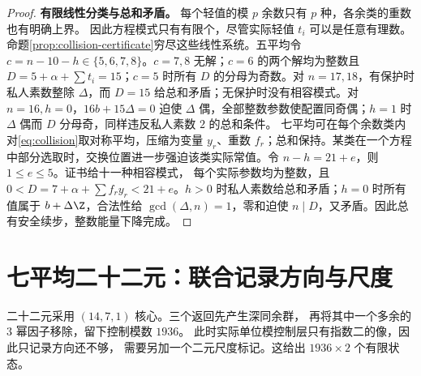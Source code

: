 \begin{proof}
\par\noindent\textbf{有限线性分类与总和矛盾。}
每个轻值的模 $p$ 余数只有 $p$ 种，各余类的重数也有明确上界。
因此方程模式只有有限个，尽管实际轻值 $t_i$ 可以是任意有理数。
命题\ref{prop:collision-certificate}穷尽这些线性系统。五平均令 $c=n-10-h\in\{5,6,7,8\}$。$c=7,8$ 无解；$c=6$ 的两个解均为整数且 $D=5+\alpha+\sum t_i=15$；$c=5$ 时所有 $D$ 的分母为奇数。对 $n=17,18$，有保护时私人素数整除 $\Delta$，而 $D=15$ 给总和矛盾；无保护时没有相容模式。对 $n=16,h=0$，$16b+15\Delta=0$ 迫使 $\Delta$ 偶，全部整数参数使配置同奇偶；$h=1$ 时 $\Delta$ 偶而 $D$ 分母奇，同样违反私人素数 $2$ 的总和条件。
七平均可在每个余数类内对\eqref{eq:collision}取对称平均，压缩为变量 $y_r$、重数 $f_r$；总和保持。某类在一个方程中部分选取时，交换位置进一步强迫该类实际常值。令 $n-h=21+e$，则 $1\le e\le5$。证书给十一种相容模式，
每个实际参数均为整数，且 $0<D=7+\alpha+\sum f_ry_r<21+e$。$h>0$ 时私人素数给总和矛盾；$h=0$ 时所有值属于 $b+\Delta\Z$，合法性给 $\gcd(\Delta,n)=1$，零和迫使 $n\mid D$，又矛盾。因此总有安全续步，整数能量下降完成。
\end{proof}


\section{七平均二十二元：联合记录方向与尺度}
二十二元采用 $(14,7,1)$ 核心。三个返回先产生深同余群，
再将其中一个多余的 $3$ 幂因子移除，留下控制模数 $1936$。
此时实际单位模控制层只有指数二的像，因此只记录方向还不够，
需要另加一个二元尺度标记。这给出 $1936\times2$ 个有限状态。

